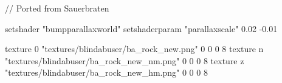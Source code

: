 // Ported from Sauerbraten

	setshader "bumpparallaxworld"
	setshaderparam "parallaxscale" 0.02 -0.01

    texture 0 "textures/blindabuser/ba_rock_new.png"  0 0 0 8
    texture n "textures/blindabuser/ba_rock_new_nm.png"  0 0 0 8
    texture z "textures/blindabuser/ba_rock_new_hm.png"  0 0 0 8
